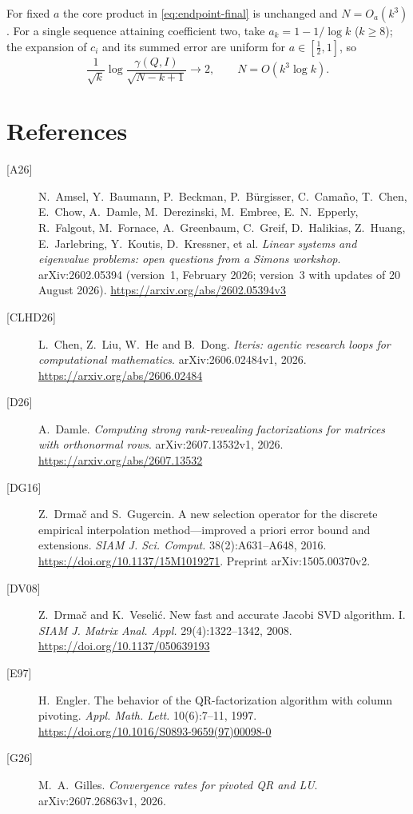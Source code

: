 \documentclass[11pt,a4paper]{article}
\theoremstyle{definition}
\numberwithin{equation}{section}
\begin{document}
For fixed $a$ the core product in \eqref{eq:endpoint-final} is unchanged and $N=O_a(k^3)$. For a single sequence
attaining coefficient two, take $a_k=1-1/\log k$ ($k\ge8$); the expansion of $c_i$ and its summed error are uniform for
$a\in[\tfrac12,1]$, so
\begin{equation}\label{eq:A13}
 \frac1{\sqrt k}\log\frac{\gamma(Q,I)}{\sqrt{N-k+1}}\longrightarrow2,\qquad N=O(k^3\log k).
\end{equation}

\section*{References}
\small
\begin{description}
\item[{[A26]}] N.~Amsel, Y.~Baumann, P.~Beckman, P.~Bürgisser, C.~Camaño, T.~Chen, E.~Chow, A.~Damle,
M.~Derezinski, M.~Embree, E.~N.~Epperly, R.~Falgout, M.~Fornace, A.~Greenbaum, C.~Greif, D.~Halikias, Z.~Huang,
E.~Jarlebring, Y.~Koutis, D.~Kressner, et al. \emph{Linear systems and eigenvalue problems: open questions from a
Simons workshop}. arXiv:2602.05394 (version~1, February 2026; version~3 with updates of 20 August 2026).
\url{https://arxiv.org/abs/2602.05394v3}
\item[{[CLHD26]}] L.~Chen, Z.~Liu, W.~He and B.~Dong. \emph{Iteris: agentic research loops for computational
mathematics}. arXiv:2606.02484v1, 2026. \url{https://arxiv.org/abs/2606.02484}
\item[{[D26]}] A.~Damle. \emph{Computing strong rank-revealing factorizations for matrices with orthonormal rows}.
arXiv:2607.13532v1, 2026. \url{https://arxiv.org/abs/2607.13532}
\item[{[DG16]}] Z.~Drmač and S.~Gugercin. A new selection operator for the discrete empirical interpolation
method---improved a priori error bound and extensions. \emph{SIAM J. Sci. Comput.} 38(2):A631--A648, 2016.
\url{https://doi.org/10.1137/15M1019271}. Preprint arXiv:1505.00370v2.
\item[{[DV08]}] Z.~Drmač and K.~Veselić. New fast and accurate Jacobi SVD algorithm. I. \emph{SIAM J. Matrix Anal.
Appl.} 29(4):1322--1342, 2008. \url{https://doi.org/10.1137/050639193}
\item[{[E97]}] H.~Engler. The behavior of the QR-factorization algorithm with column pivoting. \emph{Appl. Math.
Lett.} 10(6):7--11, 1997. \url{https://doi.org/10.1016/S0893-9659(97)00098-0}
\item[{[G26]}] M.~A.~Gilles. \emph{Convergence rates for pivoted QR and LU}. arXiv:2607.26863v1, 2026.

\end{description}
\end{document}
